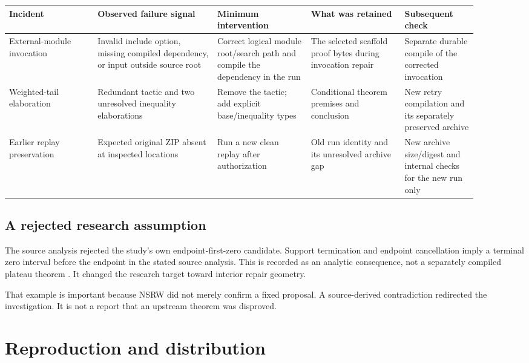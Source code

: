 \documentclass[11pt,a4paper]{article}
\begin{document}
\begingroup\small\setlength{\tabcolsep}{4pt}
\begin{longtable}{@{}>{\raggedright\arraybackslash}p{0.17\linewidth}>{\raggedright\arraybackslash}p{0.23\linewidth}>{\raggedright\arraybackslash}p{0.18\linewidth}>{\raggedright\arraybackslash}p{0.18\linewidth}>{\raggedright\arraybackslash}p{0.14\linewidth}@{}}
\toprule
\textbf{Incident} & \textbf{Observed failure signal} & \textbf{Minimum intervention} & \textbf{What was retained} & \textbf{Subsequent check} \\
\midrule
\endhead
External-module invocation & Invalid include option, missing compiled dependency, or input outside source root & Correct logical module root/search path and compile the dependency in the run & The selected scaffold proof bytes during invocation repair & Separate durable compile of the corrected invocation \\
Weighted-tail elaboration & Redundant tactic and two unresolved inequality elaborations & Remove the tactic; add explicit base/inequality types & Conditional theorem premises and conclusion & New retry compilation and its separately preserved archive \\
Earlier replay preservation & Expected original ZIP absent at inspected locations & Run a new clean replay after authorization & Old run identity and its unresolved archive gap & New archive size/digest and internal checks for the new run only \\
\bottomrule
\end{longtable}
\endgroup

\subsection{A rejected research assumption}

The source analysis rejected the study's own endpoint-first-zero candidate. Support termination and endpoint cancellation imply a terminal zero interval before the endpoint in the stated source analysis. This is recorded as an analytic consequence, not a separately compiled plateau theorem \cite{ref10}. It changed the research target toward interior repair geometry.

That example is important because NSRW did not merely confirm a fixed proposal. A source-derived contradiction redirected the investigation. It is not a report that an upstream theorem was disproved.

\section{Reproduction and distribution}
\end{document}
